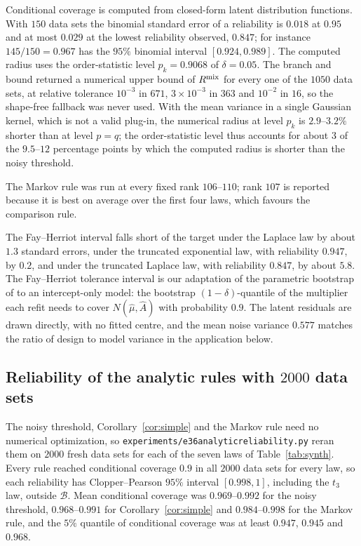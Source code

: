 \documentclass[11pt]{article}
\renewcommand{\_}{\usc\allowbreak}
\begin{document}
Conditional coverage is computed from closed-form latent distribution functions. With $150$ data sets the binomial standard error of a reliability is $0.018$ at $0.95$ and at most $0.029$ at the lowest reliability observed, $0.847$; for instance $145/150 = 0.967$ has the $95\%$ binomial interval $[0.924, 0.989]$. The computed radius uses the order-statistic level $p_k = 0.9068$ of $\delta = 0.05$. The branch and bound returned a numerical upper bound of $R^{\rm mix}$ for every one of the $1050$ data sets, at relative tolerance $10^{-3}$ in $671$, $3\times10^{-3}$ in $363$ and $10^{-2}$ in $16$, so the shape-free fallback was never used. With the mean variance in a single Gaussian kernel, which is not a valid plug-in, the numerical radius at level $p_k$ is $2.9$--$3.2\%$ shorter than at level $p = q$; the order-statistic level thus accounts for about $3$ of the $9.5$--$12$ percentage points by which the computed radius is shorter than the noisy threshold.

The Markov rule was run at every fixed rank $106$--$110$; rank $107$ is reported because it is best on average over the first four laws, which favours the comparison rule.

The Fay--Herriot interval falls short of the target under the Laplace law by about $1.3$ standard errors, under the truncated exponential law, with reliability $0.947$, by $0.2$, and under the truncated Laplace law, with reliability $0.847$, by about $5.8$. The Fay--Herriot tolerance interval is our adaptation of the parametric bootstrap of \citet{chatterjee2008} to an intercept-only model: the bootstrap $(1-\delta)$-quantile of the multiplier each refit needs to cover $N(\hat\mu, \hat A)$ with probability $0.9$. The latent residuals are drawn directly, with no fitted centre, and the mean noise variance $0.577$ matches the ratio of design to model variance in the application below.

\subsection*{Reliability of the analytic rules with $2000$ data sets}

The noisy threshold, Corollary~\ref{cor:simple} and the Markov rule need no numerical optimization, so \texttt{experiments/e36\_analytic\_reliability.py} reran them on $2000$ fresh data sets for each of the seven laws of Table~\ref{tab:synth}. Every rule reached conditional coverage $0.9$ in all $2000$ data sets for every law, so each reliability has Clopper--Pearson $95\%$ interval $[0.998, 1]$, including the $t_3$ law, outside $\mathcal B$. Mean conditional coverage was $0.969$--$0.992$ for the noisy threshold, $0.968$--$0.991$ for Corollary~\ref{cor:simple} and $0.984$--$0.998$ for the Markov rule, and the $5\%$ quantile of conditional coverage was at least $0.947$, $0.945$ and $0.968$.
\end{document}
